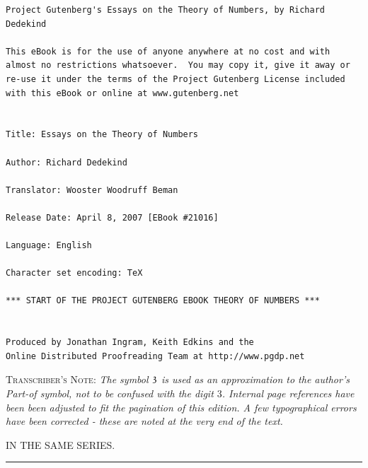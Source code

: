 \documentclass[oneside]{book}
\newcommand\partof{\mathrel{\raisebox{0.45ex}{$\mathfrak{3}$}}}   %
\begin{document}

\thispagestyle{empty}
\small
\begin{verbatim}
Project Gutenberg's Essays on the Theory of Numbers, by Richard Dedekind

This eBook is for the use of anyone anywhere at no cost and with
almost no restrictions whatsoever.  You may copy it, give it away or
re-use it under the terms of the Project Gutenberg License included
with this eBook or online at www.gutenberg.net


Title: Essays on the Theory of Numbers

Author: Richard Dedekind

Translator: Wooster Woodruff Beman

Release Date: April 8, 2007 [EBook #21016]

Language: English

Character set encoding: TeX

*** START OF THE PROJECT GUTENBERG EBOOK THEORY OF NUMBERS ***


Produced by Jonathan Ingram, Keith Edkins and the
Online Distributed Proofreading Team at http://www.pgdp.net

\end{verbatim}
\normalsize

\frontmatter
\pagestyle {empty}

\bigskip\bigskip

\noindent \textsc{Transcriber's Note:} \emph{The symbol $\partof$ is used as an approximation
to the author's Part-of symbol, not to be confused with the digit $3$.
Internal page references have been been adjusted to fit the pagination of this edition.
A few typographical errors have been corrected - these are noted at the very end of the text.}

\newpage

\begin{center}
{\large IN THE SAME SERIES.}

\medskip
\rule[.5ex]{2cm}{.2pt}
\end{center}
\end{document}

